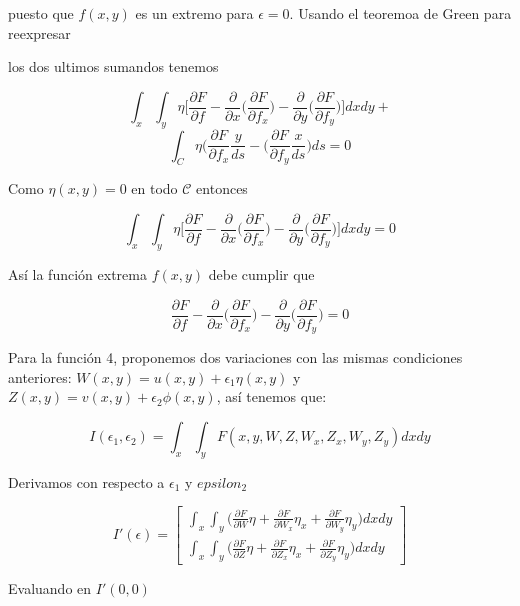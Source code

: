 \documentclass[conference]{IEEEtran}
\begin{document}
puesto que $f(x,y)$ es un extremo para $\epsilon = 0$. Usando el teoremoa de Green para reexpresar

los dos ultimos sumandos tenemos

$$
    \int_x \int_y \eta \Big[
    \frac{\partial F}{\partial f}
    - \frac{\partial }{\partial x} \Big(\frac{\partial F}{\partial f_x}\Big)
    - \frac{\partial }{\partial y} \Big(\frac{\partial F}{\partial f_y}\Big)
    \Big] dx dy +
$$
$$
    \int_C \eta \Big(
    \frac{\partial F}{\partial f_x} \frac{y}{ds}
    - \Big(\frac{\partial F}{\partial f_y} \frac{x}{ds}
    \Big) ds = 0
$$

Como $\eta(x,y) = 0$ en todo $\mathcal{C}$ entonces

$$
    \int_x \int_y \eta \Big[
    \frac{\partial F}{\partial f}
    - \frac{\partial }{\partial x} \Big(\frac{\partial F}{\partial f_x}\Big)
    - \frac{\partial }{\partial y} \Big(\frac{\partial F}{\partial f_y}\Big)
    \Big] dx dy = 0
$$

Así la función extrema $f(x,y)$ debe cumplir que

\begin{equation}
    \frac{\partial F}{\partial f}
    - \frac{\partial }{\partial x} \Big(\frac{\partial F}{\partial f_x}\Big)
    - \frac{\partial }{\partial y} \Big(\frac{\partial F}{\partial f_y}\Big)
        = 0
\end{equation}

Para la función 4, proponemos dos variaciones con las mismas condiciones anteriores:
$W(x,y) = u(x,y) + \epsilon_1 \eta(x,y)$ y $Z(x,y) = v(x,y) + \epsilon_2 \phi(x,y)$, así tenemos
que:

$$
I(\epsilon_1, \epsilon_2) = \int_x \int_y F(x, y, W, Z, W_x, Z_x, W_y, Z_y) dx dy
$$

Derivamos con respecto a $\epsilon_1$ y $epsilon_2$

$$
    I\prime(\epsilon) =
    \begin{bmatrix}
        \int_x \int_y \Big(
            \frac{\partial F}{\partial W} \eta
            + \frac{\partial F}{\partial W_x} \eta_x
            + \frac{\partial F}{\partial W_y} \eta_y
            \Big) dx dy \\
        \int_x \int_y \Big(
            \frac{\partial F}{\partial Z} \eta
            + \frac{\partial F}{\partial Z_x} \eta_x
            + \frac{\partial F}{\partial Z_y} \eta_y
            \Big) dx dy
    \end{bmatrix}
$$

Evaluando en $I\prime(0,0)$
\end{document}

